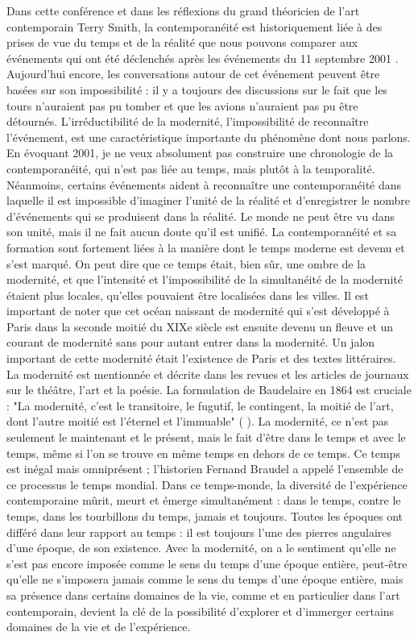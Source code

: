 \documentclass[a4paper, twoside, 12pt]{book}
\begin{document}
Dans cette conférence et dans les réflexions du grand théoricien de l'art contemporain Terry Smith, la contemporanéité est historiquement liée à des prises de vue du temps et de la réalité que nous pouvons comparer aux événements qui ont été déclenchés après les événements du 11 septembre 2001 . Aujourd'hui encore, les conversations autour de cet événement peuvent être basées sur son impossibilité : il y a toujours des discussions sur le fait que les tours n'auraient pas pu tomber et que les avions n'auraient pas pu être détournés. L'irréductibilité de la modernité, l'impossibilité de reconnaître l'événement, est une caractéristique importante du phénomène dont nous parlons. En évoquant 2001, je ne veux absolument pas construire une chronologie de la contemporanéité, qui n'est pas liée au temps, mais plutôt à la temporalité. Néanmoins, certains événements aident à reconnaître une contemporanéité dans laquelle il est impossible d'imaginer l'unité de la réalité et d'enregistrer le nombre d'événements qui se produisent dans la réalité. Le monde ne peut être vu dans son unité, mais il ne fait aucun doute qu'il est unifié. 
La contemporanéité et sa formation sont fortement liées à la manière dont le temps moderne est devenu et s'est marqué. On peut dire que ce temps était, bien sûr, une ombre de la modernité, et que l'intensité et l'impossibilité de la simultanéité de la modernité étaient plus locales, qu'elles pouvaient être localisées dans les villes. Il est important de noter que cet océan naissant de modernité qui s'est développé à Paris dans la seconde moitié du XIXe siècle est ensuite devenu un fleuve et un courant de modernité sans pour autant entrer dans la modernité. Un jalon important de cette modernité était l'existence de Paris et des textes littéraires. La modernité est mentionnée et décrite dans les revues et les articles de journaux sur le théâtre, l'art et la poésie. La formulation de Baudelaire en 1864 est cruciale : "La modernité, c'est le transitoire, le fugutif, le contingent, la moitié de l'art, dont l'autre moitié est l'éternel et l'immuable" ( ). 
La modernité, ce n'est pas seulement le maintenant et le présent, mais le fait d'être dans le temps et avec le temps, même si l'on se trouve en même temps en dehors de ce temps. Ce temps est inégal mais omniprésent ; l'historien Fernand Braudel a appelé l'ensemble de ce processus le temps mondial. Dans ce temps-monde, la diversité de l'expérience contemporaine mûrit, meurt et émerge simultanément : dans le temps, contre le temps, dans les tourbillons du temps, jamais et toujours. Toutes les époques ont différé dans leur rapport au temps : il est toujours l'une des pierres angulaires d'une époque, de son existence. Avec la modernité, on a le sentiment qu'elle ne s'est pas encore imposée comme le sens du temps d'une époque entière, peut-être qu'elle ne s'imposera jamais comme le sens du temps d'une époque entière, mais sa présence dans certains domaines de la vie, comme et en particulier dans l'art contemporain, devient la clé de la possibilité d'explorer et d'immerger certains domaines de la vie et de l'expérience. 
\end{document}
